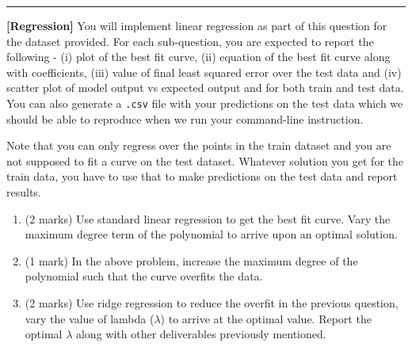 \documentclass[addpoints,12pt,solution]{exam}
\begin{document}
\hrule

\vspace{3mm}

\begin{questions}


\question \textbf{[Regression]} You will implement linear regression as part of this question for the dataset provided. For each sub-question, you are expected to report the following - (i) plot of the best fit curve, (ii) equation of the best fit curve along with coefficients, (iii) value of final least squared error over the test data and (iv) scatter plot of model output vs expected output and for both train and test data. You can also generate a \texttt{.csv} file with your predictions on the test data which we should be able to reproduce when we run your command-line instruction. 

Note that you can only regress over the points in the train dataset and you are not supposed to fit a curve on the test dataset. Whatever solution you get for the train data, you have to use that to make predictions on the test data and report results.

\begin{enumerate}[label=(\alph*)]

\item (2 marks) Use standard linear regression to get the best fit curve. Vary the maximum degree term of the polynomial to arrive upon an optimal solution. 

\begin{solution}

\end{solution}

\item (1 mark) In the above problem, increase the maximum degree of the polynomial such that the curve overfits the data.

\begin{solution}

\end{solution}

\item (2 marks) Use ridge regression to reduce the overfit in the previous question, vary the value of lambda ($\lambda$) to arrive at the optimal value. Report the optimal $\lambda$ along with other deliverables previously mentioned.


\end{enumerate}
\end{questions}
\end{document}
